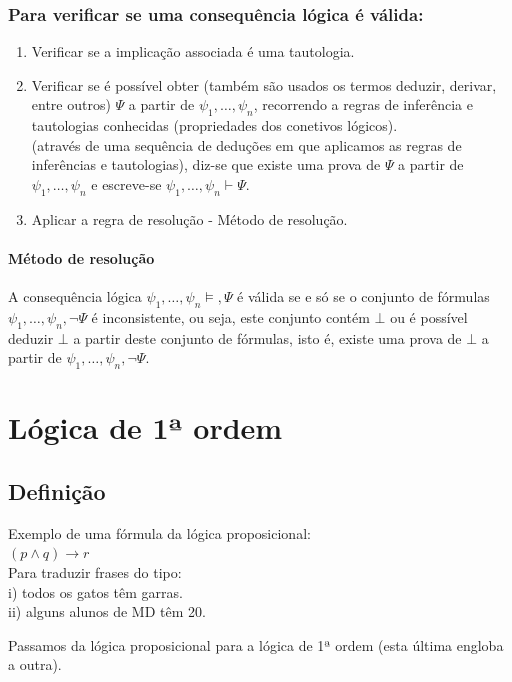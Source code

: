 \documentclass[11pt]{report}
\begin{document}
    \subsection*{Para verificar se uma consequência lógica é válida:}
    \begin{enumerate}
        \item Verificar se a implicação associada é uma tautologia.
        \item Verificar se é possível obter (também são usados os termos deduzir, derivar, entre outros) $\Psi$ a partir de $\psi_1, \ldots, \psi_n$, recorrendo a regras de inferência e tautologias conhecidas (propriedades dos conetivos lógicos).\\ (através de uma sequência de deduções em que aplicamos as regras de inferências e tautologias), diz-se que existe uma prova de $\Psi$ a partir de $\psi_1, \ldots, \psi_n$ e escreve-se $\psi_1, \ldots, \psi_n \vdash \Psi$.
        \item Aplicar a regra de resolução - Método de resolução.
    \end{enumerate}
    \subsubsection*{Método de resolução}
    A consequência lógica $\psi_1, \ldots, \psi_n \models, \Psi$ é válida se e só se o conjunto de fórmulas {$\psi_1, \ldots, \psi_n, \neg\Psi$} é inconsistente, ou seja, este conjunto contém $\bot$ ou é possível deduzir $\bot$ a partir deste conjunto de fórmulas, isto é, existe uma prova de $\bot$ a partir de $\psi_1,\ldots,\psi_n,\neg\Psi$.

    \chapter*{Lógica de 1ª ordem}
    \section*{Definição} {
    Exemplo de uma fórmula da lógica proposicional:\\
    $(p \wedge q) \rightarrow r $\\
    Para traduzir frases do tipo:\\
    i) \color{red} todos \color{black} os gatos têm garras.\\
    ii) \color{red} alguns \color{black} alunos de MD têm 20.\\
    \par Passamos da lógica proposicional para a lógica de 1ª ordem (esta última engloba a outra).
    }
\end{document}
